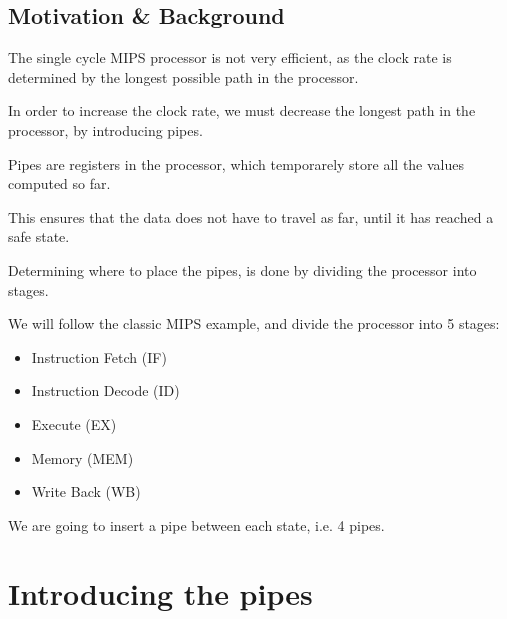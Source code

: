 \documentclass{beamer}
\begin{document}
\subsection{Motivation \& Background}
\begin{frame}
    The single cycle MIPS processor is not very efficient, as the clock rate is
    determined by the longest possible path in the processor.

    \vspace{\baselineskip}
    In order to increase the clock rate, we must decrease the longest path in
    the processor, by introducing pipes.
\end{frame}
\begin{frame}
    Pipes are registers in the processor, which temporarely store all the
    values computed so far.

    \vspace{\baselineskip}
    This ensures that the data does not have to travel as far, until it has
    reached a safe state.
\end{frame}
\begin{frame}
    Determining where to place the pipes, is done by dividing the processor
    into stages.

    \vspace{\baselineskip}
    We will follow the classic MIPS example, and divide the processor into 5
    stages:
    \begin{itemize}
        \item Instruction Fetch (IF)
        \item Instruction Decode (ID)
        \item Execute (EX)
        \item Memory (MEM)
        \item Write Back (WB)
    \end{itemize}
    We are going to insert a pipe between each state, i.e. 4 pipes.
\end{frame}

\section{Introducing the pipes}
\end{document}
